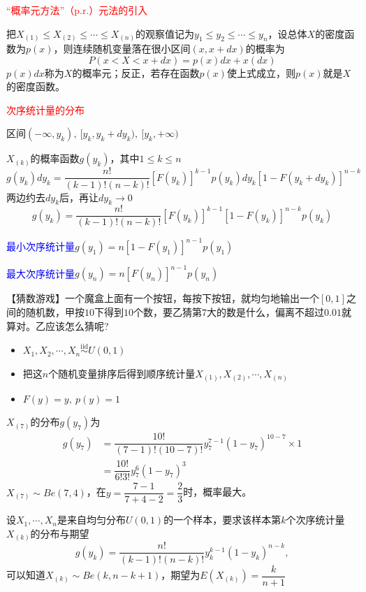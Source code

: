 \textcolor{red}{``概率元方法''（p.r.）元法的引入}

把$X_{(1)}\leqslant X_{(2)}\leqslant\cdots\leqslant X_{(n)}$的观察值记为$y_1\leqslant y_2\leqslant\cdots\leqslant y_n$，设总体$X$的密度函数为$p(x)$，则连续随机变量落在很小区间$(x,x+dx)$的概率为
\[
    P(x<X<x+dx) = p(x)dx+x(dx)
\]
$p(x)dx$称为$X$的概率元；反正，若存在函数$p(x)$使上式成立，则$p(x)$就是$X$的密度函数。

\textcolor{red}{次序统计量的分布}

区间$(-\infty, y_k),\ [ y_k,y_k+dy_k ),\ [y_k, +\infty)$


$X_{(k)}$的概率函数$g(y_k)$，其中$1 \leqslant k \leqslant n$
\[
    g(y_k)dy_k = \dfrac{n!}{(k-1)!(n-k)!}[F(y_k)]^{k-1}p(y_k)dy_k[1-F(y_k+dy_k)]^{n-k}
\]
两边约去$dy_k$后，再让$dy_k\rightarrow 0$
\[
    g(y_k) = \dfrac{n!}{(k-1)!(n-k)!}[F(y_k)]^{k-1}[1-F(y_k)]^{n-k}p(y_k)
\]

\textcolor{blue}{最小次序统计量}\quad $ g(y_1) = n[1-F(y_1)]^{n-1}p(y_1) $

\textcolor{blue}{最大次序统计量}\quad $ g(y_n) = n[F(y_n)]^{n-1}p(y_n) $

\begin{example}
    【猜数游戏】一个魔盒上面有一个按钮，每按下按钮，就均匀地输出一个$[0,1]$之间的随机数，甲按$10$下得到$10$个数，要乙猜第$7$大的数是什么，偏离不超过$0.01$就算对。乙应该怎么猜呢?

    \begin{itemize}
        \item $X_1,X_2,\cdots,X_n\overset{\mathrm{iid}}{\sim}U(0,1)$
        \item 把这$n$个随机变量排序后得到顺序统计量$X_{(1)},X_{(2)},\cdots,X_{(n)}$
        \item $F(y) = y,\ p(y) = 1$
    \end{itemize}
    $X_{(7)}$的分布$g(y_{7})$为
    \[
        \begin{array}{ll}
            g(y_{7}) &= \dfrac{10!}{(7-1)!(10-7)!}y_{7}^{7-1}(1-y_{7})^{10-7}\times 1\\
            &=\dfrac{10!}{6!3!}y_{7}^{6}(1-y_{7})^{3}
        \end{array}
    \]
    $X_{(7)}\sim Be(7,4)$，在$y=\dfrac{7-1}{7+4-2}=\dfrac{2}{3}$时，概率最大。
\end{example}

\begin{example}
    设$X_1,\cdots,X_n$是来自均匀分布$U(0,1)$的一个样本，要求该样本第$k$个次序统计量$X_(k)$的分布与期望
    \[
        g(y_k) = \dfrac{n!}{(k-1)!(n-k)!}y_{k}^{k-1}(1-y_k)^{n-k},
    \]
    可以知道$X_{(k)}\sim Be(k, n-k+1)$，期望为$E(X_{(k)}) = \dfrac{k}{n+1}$
\end{example}

